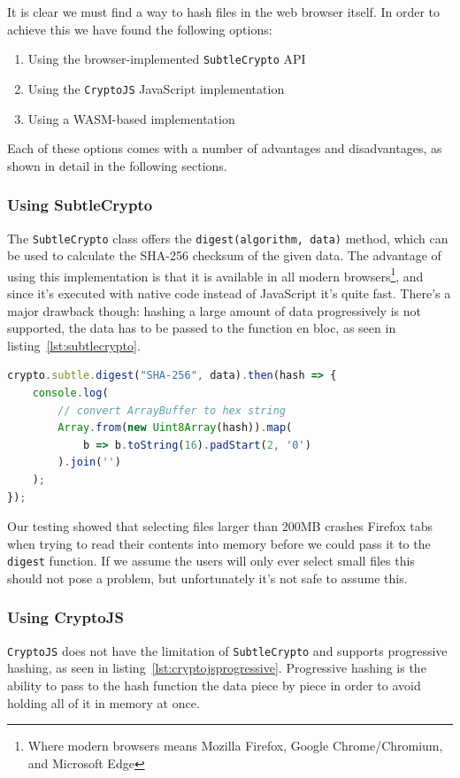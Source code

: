 It is clear we must find a way to hash files in the web browser itself.
In order to achieve this we have found the following options:

\begin{enumerate}
    \item Using the browser-implemented \texttt{SubtleCrypto}\cite{subtlecrypto} \gls{API}
    \item Using the \texttt{CryptoJS}\cite{cryptojs} JavaScript implementation
    \item Using a \gls{WASM}-based implementation
\end{enumerate}

Each of these options comes with a number of advantages and disadvantages, as shown in detail in the following sections.

\subsubsection{Using SubtleCrypto}
\label{subsubsec:subtlecrypto}
The \texttt{SubtleCrypto} class offers the \texttt{digest(algorithm, data)} method, which can be used to
calculate the \gls{SHA-256} checksum of the given data.
The advantage of using this implementation is that it is available in all modern browsers\footnote{Where modern browsers means Mozilla Firefox, Google Chrome/Chromium, and Microsoft Edge},
and since it's executed with native code instead of JavaScript it's quite fast.
There's a major drawback though: hashing a large amount of data progressively is not supported, the data has to be
passed to the function en bloc, as seen in listing~\ref{lst:subtlecrypto}.

\begin{lstlisting}[caption={Using SubtleCrypto for calculating SHA-256 checksums}, captionpos=b, language=JavaScript, label={lst:subtlecrypto}]
crypto.subtle.digest("SHA-256", data).then(hash => {
    console.log(
        // convert ArrayBuffer to hex string
        Array.from(new Uint8Array(hash)).map(
            b => b.toString(16).padStart(2, '0')
        ).join('')
    );
});
\end{lstlisting}
Our testing showed that selecting files larger than 200MB crashes Firefox tabs when trying to read their contents
into memory before we could pass it to the \texttt{digest} function.
If we assume the users will only ever select small files this should not pose a problem, but unfortunately it's not safe to assume this.

\subsubsection{Using CryptoJS}
\label{subsubsec:cryptojs}
\texttt{CryptoJS} does not have the limitation of \texttt{SubtleCrypto} and supports progressive hashing,
as seen in listing~\ref{lst:cryptojsprogressive}.
Progressive hashing is the ability to pass to the hash function the data piece by piece in order to avoid holding all
of it in memory at once.

